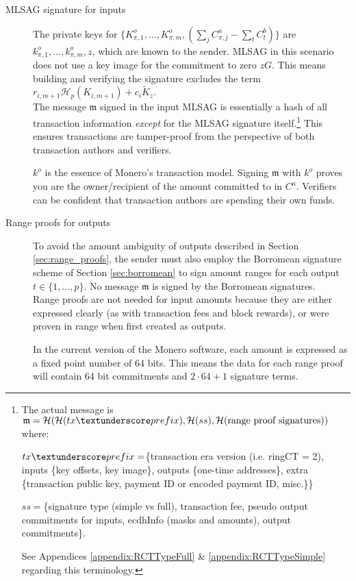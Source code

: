 \begin{description}%

	\item [MLSAG signature for inputs]
	The private keys for
	\(\{K_{\pi,1}^o,...,K_{\pi,m}^o, (\sum\limits_j C_{\pi, j}^a - \sum\limits_t C^b_{t})\}\)
	are\\
	\( k_{\pi,1}^o,...,k_{\pi,m}^o, z \), which are known to the sender.
	MLSAG in this scenario does not use a key image for the commitment to zero $z G$. This means building and verifying the signature excludes the term $r_{i,m+1} \mathcal{H}_p(K_{i,m+1}) + c_i \tilde{K}_z$.\\

	The message $\mathfrak{m}$ signed in the input MLSAG is essentially a hash of all transaction information {\em except} for the MLSAG signature itself.\footnote{\label{MLSAG_message}The actual message is $\mathfrak{m} = \mathcal{H}(\mathcal{H}(tx\textunderscore prefix),\mathcal{H}(ss),\mathcal{H}(\text{range proof signatures}))$ where:\par
	$tx\textunderscore prefix = $\{transaction era version (i.e. ringCT = 2), inputs \{key offsets, key image\}, outputs \{one-time addresses\}, extra \{transaction public key, payment ID or encoded payment ID, misc.\}\}\par
	$ss = $\{signature type (simple vs full), transaction fee, pseudo output commitments for inputs, ecdhInfo (masks and amounts), output commitments\}.\par
	See Appendices \ref{appendix:RCTTypeFull} \& \ref{appendix:RCTTypeSimple} regarding this terminology.} This ensures transactions are tamper-proof from the perspective of both transaction authors and verifiers.

	$k^o$ is the essence of Monero's transaction model. Signing $\mathfrak{m}$ with $k^o$ proves you are the owner/recipient of the amount committed to in $C^a$. Verifiers can be confident that transaction authors are spending their own funds.

	\item[Range proofs for outputs]
	To avoid the amount ambiguity of outputs described in Section  \ref{sec:range_proofs}, the sender must also employ the Borromean signature scheme of Section \ref{sec:borromean} to sign amount ranges for each output $t \in \{1, ..., p\}$. No message $\mathfrak{m}$ is signed by the Borromean signatures.\\

	Range proofs are not needed for input amounts because they are either expressed clearly (as with transaction fees and block rewards), or were proven in range when first created as outputs.

	In the current version of the Monero software, each amount is expressed as a fixed point number of 64 bits. This means the data for each range proof will contain 64 bit commitments and $2 \cdot 64 + 1$ signature terms.

\end{description}


